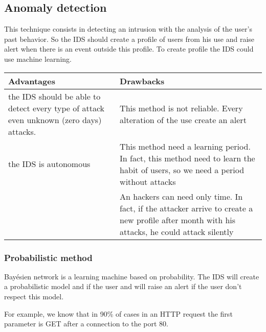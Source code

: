 \subsection{Anomaly detection}

This technique consists in detecting an intrusion with the analysis of the user's past behavior. So the IDS should
create a profile of users from his use and raise alert when there is an event outside this profile. To create
profile the IDS could use machine learning.
~\\

\begin{tabular}{|p{}|p{}|} \hline
Advantages                                                                                                 & Drawbacks \\ \hline the IDS should be able to detect every type of
attack even unknown (zero days) attacks.                                                                   & This method is not reliable. Every
alteration of the use create an alert                                                                                  \\
  \hline the IDS is autonomous                                                                             & This method
need a learning period. In fact, this method need to learn the habit of users,
so we need a period without attacks                                                                                    \\ \hline & An hackers can need only time. In fact,
if the attacker arrive to create a new profile after month with his attacks, he
could attack silently                                                                                                  \\ \hline

\end{tabular}


\subsubsection{Probabilistic method}
Bayésien network is a learning machine based on probability. The IDS will create a probabilistic model and if the
user and will raise an alert if the user don't respect this model.

For example, we know that in 90\% of cases in an HTTP request the first parameter is GET after a connection to the
port 80.


%










